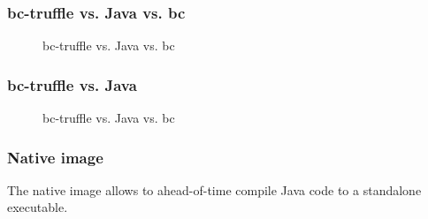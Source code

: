 \documentclass[11pt,handout]{beamer}
\begin{document}
\begin{frame}[fragile]
  \frametitle{bc-truffle vs. Java vs. bc}
    \begin{figure}[ht]
    \centering
    \caption{bc-truffle vs. Java vs. bc}
    \label{fig:comp_3}
  \end{figure}
\end{frame}

\begin{frame}[fragile]
  \frametitle{bc-truffle vs. Java}
    \begin{figure}[ht]
    \centering
    \caption{bc-truffle vs. Java vs. bc}
    \label{fig:comp_2}
  \end{figure}
\end{frame}

\begin{frame}[fragile]
  \frametitle{Native image}
  The native image allows to ahead-of-time compile Java code to a standalone
  executable.
\end{frame}
\end{document}
